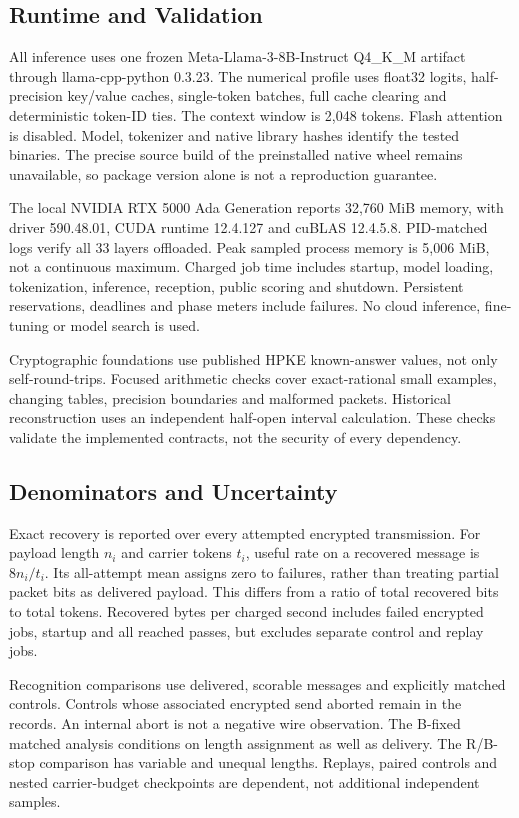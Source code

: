 \documentclass[a4paper,twoside]{article}
\begin{document}
\subsection{Runtime and Validation}
\noindent All inference uses one frozen Meta-Llama-3-8B-Instruct Q4\_K\_M artifact through llama-cpp-python 0.3.23. The numerical profile uses float32 logits, half-precision key/value caches, single-token batches, full cache clearing and deterministic token-ID ties. The context window is 2,048 tokens. Flash attention is disabled. Model, tokenizer and native library hashes identify the tested binaries. The precise source build of the preinstalled native wheel remains unavailable, so package version alone is not a reproduction guarantee.

The local NVIDIA RTX 5000 Ada Generation reports 32,760 MiB memory, with driver 590.48.01, CUDA runtime 12.4.127 and cuBLAS 12.4.5.8. PID-matched logs verify all 33 layers offloaded. Peak sampled process memory is 5,006 MiB, not a continuous maximum. Charged job time includes startup, model loading, tokenization, inference, reception, public scoring and shutdown. Persistent reservations, deadlines and phase meters include failures. No cloud inference, fine-tuning or model search is used.

Cryptographic foundations use published HPKE known-answer values, not only self-round-trips. Focused arithmetic checks cover exact-rational small examples, changing tables, precision boundaries and malformed packets. Historical reconstruction uses an independent half-open interval calculation. These checks validate the implemented contracts, not the security of every dependency.

\subsection{Denominators and Uncertainty}
\noindent Exact recovery is reported over every attempted encrypted transmission. For payload length $n_i$ and carrier tokens $t_i$, useful rate on a recovered message is $8n_i/t_i$. Its all-attempt mean assigns zero to failures, rather than treating partial packet bits as delivered payload. This differs from a ratio of total recovered bits to total tokens. Recovered bytes per charged second includes failed encrypted jobs, startup and all reached passes, but excludes separate control and replay jobs.

Recognition comparisons use delivered, scorable messages and explicitly matched controls. Controls whose associated encrypted send aborted remain in the records. An internal abort is not a negative wire observation. The B-fixed matched analysis conditions on length assignment as well as delivery. The R/B-stop comparison has variable and unequal lengths. Replays, paired controls and nested carrier-budget checkpoints are dependent, not additional independent samples.
\end{document}
